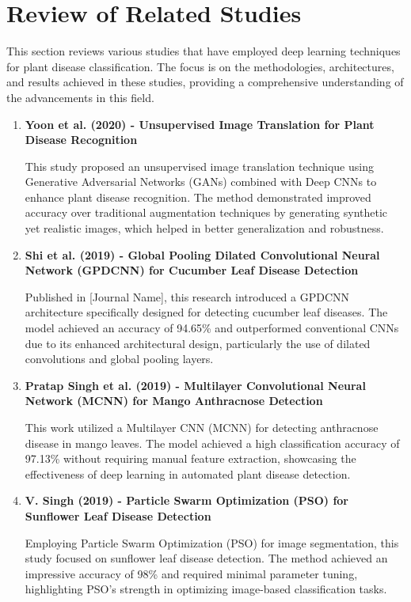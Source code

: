 \section*{Review of Related Studies}
This section reviews various studies that have employed deep learning techniques for plant disease classification. The focus is on the methodologies, architectures, and results achieved in these studies, providing a comprehensive understanding of the advancements in this field.
\begin{enumerate}[label=\arabic*.]
  \item \textbf{Yoon et al. (2020) - Unsupervised Image Translation for Plant Disease Recognition}

  This study proposed an unsupervised image translation technique using Generative Adversarial Networks (GANs) combined with Deep CNNs to enhance plant disease recognition. The method demonstrated improved accuracy over traditional augmentation techniques by generating synthetic yet realistic images, which helped in better generalization and robustness.

  \item \textbf{Shi et al. (2019) - Global Pooling Dilated Convolutional Neural Network (GPDCNN) for Cucumber Leaf Disease Detection}

  Published in [Journal Name], this research introduced a GPDCNN architecture specifically designed for detecting cucumber leaf diseases. The model achieved an accuracy of 94.65\% and outperformed conventional CNNs due to its enhanced architectural design, particularly the use of dilated convolutions and global pooling layers.

  \item \textbf{Pratap Singh et al. (2019) - Multilayer Convolutional Neural Network (MCNN) for Mango Anthracnose Detection}

  This work utilized a Multilayer CNN (MCNN) for detecting anthracnose disease in mango leaves. The model achieved a high classification accuracy of 97.13\% without requiring manual feature extraction, showcasing the effectiveness of deep learning in automated plant disease detection.

  \item \textbf{V. Singh (2019) - Particle Swarm Optimization (PSO) for Sunflower Leaf Disease Detection}

  Employing Particle Swarm Optimization (PSO) for image segmentation, this study focused on sunflower leaf disease detection. The method achieved an impressive accuracy of 98\% and required minimal parameter tuning, highlighting PSO's strength in optimizing image-based classification tasks.


\end{enumerate}
